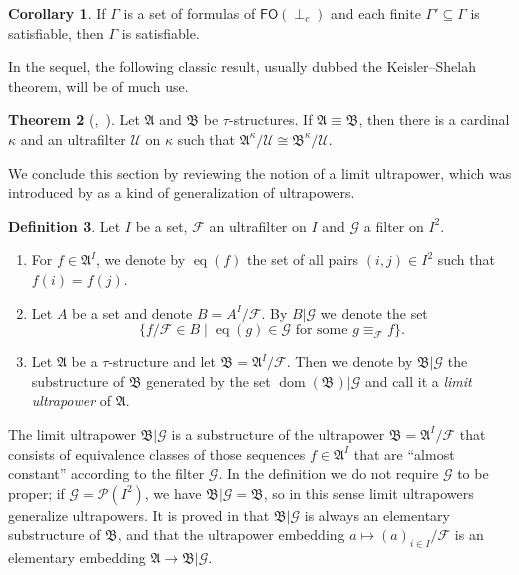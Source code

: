 \documentclass[a4paper]{amsart}
\theoremstyle{definition}
\newtheorem{definition}{Definition}[section]
\newtheorem{theorem}[definition]{Theorem}
\newtheorem{corollary}[definition]{Corollary}
\theoremstyle{remark}
\newcommand{\A}{\mathcal{A}}
\newcommand{\B}{\mathcal{B}}
\newcommand{\U}{\mathcal{U}}
\DeclareMathOperator{\Pow}{\wp}
\DeclareMathOperator{\dom}{dom}
\newcommand\foil{\mathsf{FO}(\perp_c)}
\theoremstyle{definition}
\renewcommand{\A}{\mathfrak{A}}
\renewcommand{\B}{\mathfrak{B}}
\DeclareMathOperator{\eq}{eq}
\newcommand{\cF}{\mathcal{F}}
\newcommand{\cG}{\mathcal{G}}
\renewcommand{\Pow}{\mathcal{P}}
\begin{document}
\begin{corollary}
    If $\Gamma$ is a set of formulas of $\foil$ and each finite $\Gamma'\subseteq\Gamma$ is satisfiable, then $\Gamma$ is satisfiable.
\end{corollary}

In the sequel, the following classic result, usually dubbed the Keisler--Shelah theorem, will be of much use.

\begin{theorem}[\textcite{keisler-thesis},~\textcite{MR0297554}]
    Let $\A$ and $\B$ be $\tau$-structures. If $\A\equiv\B$, then there is a cardinal $\kappa$ and an ultrafilter $\U$ on $\kappa$ such that $\A^\kappa/\U \cong \B^\kappa/\U$.
\end{theorem}



We conclude this section by reviewing the notion of a limit ultrapower, which was introduced by \textcite{MR0148547} as a kind of generalization of ultrapowers.

\begin{definition}
    Let $I$ be a set, $\cF$ an ultrafilter on $I$ and $\cG$ a filter on $I^2$.
    \begin{enumerate}
        \item For $f\in\A^I$, we denote by $\eq(f)$ the set of all pairs $(i,j)\in I^2$ such that $f(i) = f(j)$.
        \item Let $A$ be a set and denote $B = A^I/\cF$. By $B|\cG$ we denote the set
        \[
            \{ f/\cF \in B \mid \text{$\eq(g)\in\cG$ for some $g \equiv_\cF f$} \}.
        \]
        \item Let $\A$ be a $\tau$-structure and let $\B = \A^I/\cF$. Then we denote by $\B|\cG$ the substructure of $\B$ generated by the set $\dom(\B)|\cG$ and call it a \emph{limit ultrapower} of $\A$.
    \end{enumerate}
\end{definition}

\noindent The limit ultrapower $\B|\cG$ is a substructure of the ultrapower $\B = \A^I/\cF$ that consists of equivalence classes of those sequences $f\in\A^I$ that are ``almost constant'' according to the filter $\cG$. In the definition we do not require $\cG$ to be proper; if $\cG = \Pow(I^2)$, we have $\B|\cG = \B$, so in this sense limit ultrapowers generalize ultrapowers. It is proved in \cite{MR0148547} that $\B|\cG$ is always an elementary substructure of $\B$, and that the ultrapower embedding $a\mapsto (a)_{i\in I}/\cF$ is an elementary embedding $\A\to\B|\cG$.
\end{document}
